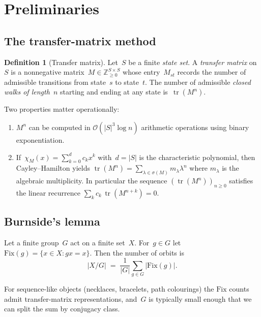 \documentclass[11pt,a4paper]{article}
\theoremstyle{definition}
\newtheorem{definition}{Definition}[section]
\theoremstyle{plain}
\DeclareMathOperator{\tr}{tr}
\newcommand{\Z}{\mathbb{Z}}
\newcommand{\bigo}{\mathcal{O}}
\begin{document}
\section{Preliminaries}
\label{sec:prelim}

\subsection{The transfer-matrix method}

\begin{definition}[Transfer matrix]
Let~$S$ be a finite \emph{state set}.  A \emph{transfer matrix} on~$S$ is
a nonnegative matrix~$M \in \Z_{\ge 0}^{S\times S}$ whose entry~$M_{st}$
records the number of admissible transitions from state~$s$ to state~$t$.
The number of admissible \emph{closed walks of length~$n$} starting and
ending at any state is~$\tr(M^n)$.
\end{definition}

Two properties matter operationally:
\begin{enumerate}[label=(P\arabic*)]
\item $M^n$ can be computed in $\bigo(|S|^3 \log n)$ arithmetic operations
  using binary exponentiation.
\item If~$\chi_M(x) = \sum_{k=0}^{d} c_k x^k$ with~$d = |S|$ is the
  characteristic polynomial, then Cayley--Hamilton yields
  $\tr(M^n) = \sum_{\lambda \in \sigma(M)} m_\lambda \lambda^n$ where
  $m_\lambda$ is the algebraic multiplicity.  In particular the sequence
  $(\tr(M^n))_{n\ge 0}$ satisfies the linear recurrence
  $\sum_k c_k\,\tr(M^{n+k}) = 0$.
\end{enumerate}

\subsection{Burnside's lemma}

Let a finite group~$G$ act on a finite set~$X$.  For~$g\in G$ let
$\mathrm{Fix}(g) = \{x\in X : gx = x\}$.  Then the number of orbits is
\begin{equation}
\label{eq:burnside}
|X/G| \;=\; \frac{1}{|G|}\sum_{g\in G} |\mathrm{Fix}(g)|.
\end{equation}

For sequence-like objects (necklaces, bracelets, path colourings) the
$\mathrm{Fix}$ counts admit transfer-matrix representations, and~$G$ is
typically small enough that we can split the sum by conjugacy class.
\end{document}
